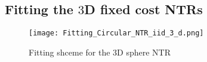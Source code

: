 \documentclass[11pt]{article}
\begin{document}
\begin{appendices}

\section{Fitting the $3$D fixed cost NTRs}\label{section: Fitting_Ellipse_Appendix}
\begin{figure}[!ht]
  \centering
  \texttt{[image: Fitting\_Circular\_NTR\_iid\_3\_d.png]}
  \caption{Fitting shceme for the $3$D sphere NTR}
  \label{fig: Sphere_Fitting_Appendix}
\end{figure}

\end{appendices}
\ifdefined\COMPILINGMAIN
\else
\end{document}
